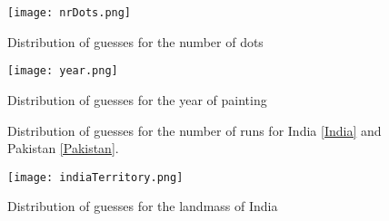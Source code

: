 \documentclass{article}
\begin{document}
				
\newpage

\begin{figure}
\begin{center}
\texttt{[image: nrDots.png]}
\caption{Distribution of guesses for the number of dots}
\label{nrDots}
\end{center}	
\end{figure}




\begin{figure}
\begin{center}
\texttt{[image: year.png]}
\caption{Distribution of guesses for the year of painting}
\label{painting}
\end{center}	
\end{figure}





\begin{figure}[ht!]
     \begin{center}
    \end{center}
    \caption{Distribution of guesses for the number of runs for India \ref{India} and Pakistan \ref{Pakistan}.}
\end{figure}


\begin{figure}
\begin{center}
\texttt{[image: indiaTerritory.png]}
\caption{Distribution of guesses for the landmass of India}
\label{pareto}
\end{center}	
\end{figure}
\end{document}
